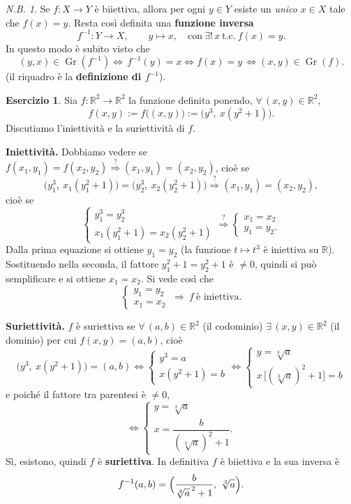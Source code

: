 \documentclass[11pt,a4paper]{article}
\newcommand{\R}{\mathbb{R}}
\newcommand{\Gr}{\operatorname{Gr}}
\newcommand{\inv}{^{-1}}
\theoremstyle{definition}
\newtheorem{esercizio}[definizione]{Esercizio}
\theoremstyle{plain}
\theoremstyle{remark}
\newtheorem*{nb}{N.B.}
\begin{document}
\begin{nb}
Se $f\colon X\to Y$ \`e biiettiva, allora per ogni $y\in Y$ esiste un \emph{unico} $x\in X$ tale che $f(x)=y$. Resta cos\`i definita una \textbf{funzione inversa}
\[
f\inv\colon Y\longrightarrow X,\qquad y\longmapsto x,\quad\text{con}\ \exists!\, x\ \text{t.c.}\ f(x)=y .
\]
In questo modo \`e subito visto che
\[
(y,x)\in\Gr(f\inv)\iff {\,f\inv(y)=x\iff f(x)=y\,}\iff(x,y)\in\Gr(f).
\]
(il riquadro \`e la \textbf{definizione di $f\inv$}).
\end{nb}

\begin{esercizio}\label{es:R2}
Sia $f\colon\R^2\to\R^2$ la funzione definita ponendo, $\forall\,(x,y)\in\R^2$,
\[
f(x,y):=f\bigl((x,y)\bigr):=\bigl(y^3,\ x(y^2+1)\bigr).
\]
Discutiamo l'iniettivit\`a e la suriettivit\`a di $f$.
\end{esercizio}

\textbf{Iniettivit\`a.} Dobbiamo vedere se $f(x_1,y_1)=f(x_2,y_2)\overset{?}{\Rightarrow}(x_1,y_1)=(x_2,y_2)$, cio\`e se
\[
\bigl(y_1^3,\ x_1(y_1^2+1)\bigr)=\bigl(y_2^3,\ x_2(y_2^2+1)\bigr)\overset{?}{\Longrightarrow}(x_1,y_1)=(x_2,y_2),
\]
cio\`e se
\[
\begin{cases} y_1^3=y_2^3\\ x_1(y_1^2+1)=x_2(y_2^2+1)\end{cases}\overset{?}{\Longrightarrow}\begin{cases}x_1=x_2\\ y_1=y_2.\end{cases}
\]
Dalla prima equazione si ottiene $y_1=y_2$ (la funzione $t\mapsto t^3$ \`e iniettiva su $\R$). Sostituendo nella seconda, il fattore $y_1^2+1=y_2^2+1$ \`e $\neq0$, quindi si pu\`o semplificare e si ottiene $x_1=x_2$.
Si vede cos\`i che
\[
\begin{cases}y_1=y_2\\ x_1=x_2\end{cases}\ \Longrightarrow\ f\ \text{\`e iniettiva}.
\]

\textbf{Suriettivit\`a.} $f$ \`e suriettiva se $\forall\,(a,b)\in\R^2$ (il codominio) $\exists\,(x,y)\in\R^2$ (il dominio) per cui $f(x,y)=(a,b)$, cio\`e
\[
\bigl(y^3,\ x(y^2+1)\bigr)=(a,b)
\iff
\begin{cases} y^3=a\\ x(y^2+1)=b\end{cases}
\iff
\begin{cases} y=\sqrt[3]{a}\\ x\,\bigl[(\sqrt[3]{a})^2+1\bigr]=b\end{cases}
\]
e poich\'e il fattore tra parentesi \`e $\neq0$,
\[
\iff
\begin{cases} y=\sqrt[3]{a}\\[2pt] x=\dfrac{b}{(\sqrt[3]{a})^2+1}.\end{cases}
\]
Sì, esistono, quindi $f$ \`e \textbf{suriettiva}. In definitiva $f$ \`e biiettiva e la sua inversa \`e
\[
f\inv(a,b)=\Bigl(\frac{b}{\sqrt[3]{a}^{\,2}+1},\ \sqrt[3]{a}\Bigr).
\]
\end{document}
